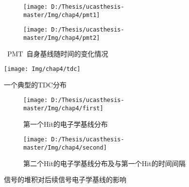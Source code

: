 \begin{figure}[!htbp]
  \centering
  \begin{subfigure}[b]{\MySubFactor\textwidth}
    \texttt{[image: D:/Thesis/ucasthesis-master/Img/chap4/pmt1]}
    \caption{ }
    \label{fig:pmt_1}
  \end{subfigure}%
  \quad\quad\quad\quad\quad\quad%
  \begin{subfigure}[b]{\MySubFactor\textwidth}
    \texttt{[image: D:/Thesis/ucasthesis-master/Img/chap4/pmt2]}
    \caption{ }
    \label{fig:pmt_2}
  \end{subfigure}
    \caption{ ~PMT~自身基线随时间的变化情况}
  \label{fig:pmt}
\end{figure}


\begin{figure}[!htbp]
  \centering
   \texttt{[image: Img/chap4/tdc]}
    \caption{一个典型的TDC分布}
  \label{fig:tdc}
\end{figure}



\begin{figure}[!htbp]
  \centering
  \begin{subfigure}[b]{\MySubFactor\textwidth}
    \texttt{[image: D:/Thesis/ucasthesis-master/Img/chap4/first]}
    \caption{第一个Hit的电子学基线分布}
    \label{fig:firstsecond_1}
  \end{subfigure}%
  \quad\quad\quad\quad\quad\quad%
  \begin{subfigure}[b]{\MySubFactor\textwidth}
    \texttt{[image: D:/Thesis/ucasthesis-master/Img/chap4/second]}
    \caption{第二个Hit的电子学基线分布及与第一个Hit的时间间隔}
    \label{fig:firstsecond_2}
  \end{subfigure}
    \caption{信号的堆积对后续信号电子学基线的影响}
  \label{fig:firstsecond}
\end{figure}

